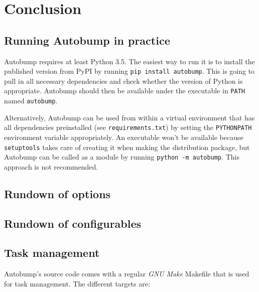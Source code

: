 \documentclass{l4proj}
\newcommand\genericstyle{\lstset{basicstyle=\ttm}}
\newcommand\codeinline[1]{{\genericstyle\lstinline!#1!}}
\begin{document}
\chapter{Conclusion}
\label{Conclusion}


\begin{appendices}

\chapter{Running Autobump in practice}
\label{AutobumpInPractice}

Autobump requires at least Python 3.5. The easiest way to run it is to
install the published version from PyPI by running \codeinline{pip
install autobump}. This is going to pull in all necessary dependencies
and check whether the version of Python is appropriate. Autobump
should then be available under the executable in \codeinline{PATH}
named \codeinline{autobump}.

Alternatively, Autobump can be used from within a virtual environment
that has all dependencies preinstalled (see
\codeinline{requirements.txt}) by setting the \codeinline{PYTHONPATH}
environment variable appropriately. An executable won't be available
because \codeinline{setuptools} takes care of creating it when making
the distribution package, but Autobump can be called as a module by
running \codeinline{python -m autobump}. This approach is not recommended.

\section{Rundown of options}
\label{RundownOptions}

\section{Rundown of configurables}
\label{RundownConfigurables}

\section{Task management}

Autobump's source code comes with a regular \textit{GNU Make} Makefile
that is used for task management. The different targets are:


\end{appendices}
\end{document}
